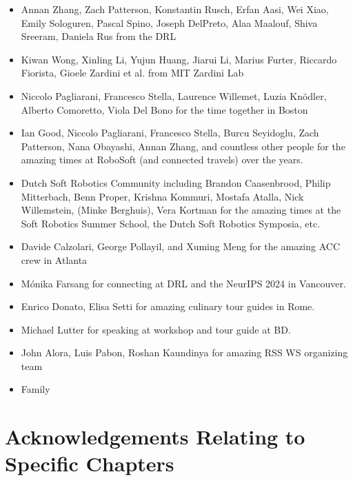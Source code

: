 \begin{itemize}
    \item Annan Zhang, Zach Patterson, Konstantin Rusch, Erfan Aasi, Wei Xiao, Emily Sologuren, Pascal Spino, Joseph DelPreto, Alaa Maalouf, Shiva Sreeram, Daniela Rus from the DRL
    \item Kiwan Wong, Xinling Li, Yujun Huang, Jiarui Li, Marius Furter, Riccardo Fiorista, Gioele Zardini et al. from MIT Zardini Lab
    \item Niccolo Pagliarani, Francesco Stella, Laurence Willemet, Luzia Knödler, Alberto Comoretto, Viola Del Bono for the time together in Boston
    \item Ian Good, Niccolo Pagliarani, Francesco Stella, Burcu Seyidoglu, Zach Patterson, Nana Obayashi, Annan Zhang, and countless other people for the amazing times at RoboSoft (and connected travels) over the years.
    \item Dutch Soft Robotics Community including Brandon Caasenbrood, Philip Mitterbach, Benn Proper, Krishna Kommuri, Mostafa Atalla, Nick Willemstein, (Minke Berghuis), Vera Kortman for the amazing times at the Soft Robotics Summer School, the Dutch Soft Robotics Symposia, etc.
    \item Davide Calzolari, George Pollayil, and Xuming Meng for the amazing ACC crew in Atlanta
    \item Mónika Farsang for connecting at DRL and the NeurIPS 2024 in Vancouver.
    \item Enrico Donato, Elisa Setti for amazing culinary tour guides in Rome.
    \item Michael Lutter for speaking at workshop and tour guide at BD.
    \item John Alora, Luis Pabon, Roshan Kaundinya for amazing RSS WS organizing team
    \item Family
\end{itemize}

\section*{Acknowledgements Relating to Specific Chapters}
\vspace{0.3cm}

